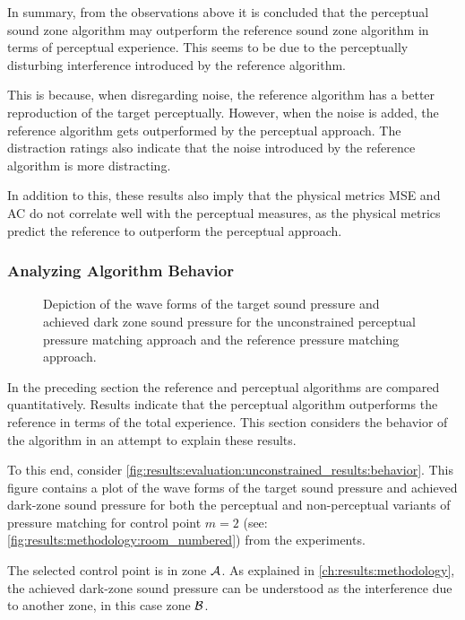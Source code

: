 In summary, from the observations above it is concluded that the perceptual sound zone algorithm may
outperform the reference sound zone algorithm in terms of perceptual experience.
This seems to be due to the perceptually disturbing interference introduced by the reference algorithm.

This is because, when disregarding noise, the reference algorithm has a better reproduction of the target perceptually.
However, when the noise is added, the reference algorithm gets outperformed by the perceptual approach.
The distraction ratings also indicate that the noise introduced by the reference algorithm is more distracting.

In addition to this, these results also imply that the physical metrics MSE and AC do not correlate well 
with the perceptual measures, as the physical metrics predict the reference to outperform the perceptual approach.

\subsubsection*{Analyzing Algorithm Behavior}
\begin{figure}[]
    \centering
    
    \caption{Depiction of the wave forms of the target sound pressure and achieved dark zone sound pressure for the 
        unconstrained perceptual pressure matching approach and the reference pressure matching approach.}
        \label{fig:results:evaluation:unconstrained_results:behavior}
\end{figure}

In the preceding section the reference and perceptual algorithms are compared quantitatively.
Results indicate that the perceptual algorithm outperforms the reference in terms of the total experience.
This section considers the behavior of the algorithm in an attempt to explain these results.

To this end, consider \autoref{fig:results:evaluation:unconstrained_results:behavior}.
This figure contains a plot of the wave forms of the target sound pressure and achieved dark-zone sound pressure 
for both the perceptual and non-perceptual variants of pressure matching for control point $m=2$ 
(see: \autoref{fig:results:methodology:room_numbered}) from the experiments.

The selected control point is in zone $\mathcal{A}$. 
As explained in \autoref{ch:results:methodology}, the achieved dark-zone sound pressure can be understood 
as the interference due to another zone, in this case zone $\mathcal{B}$.

